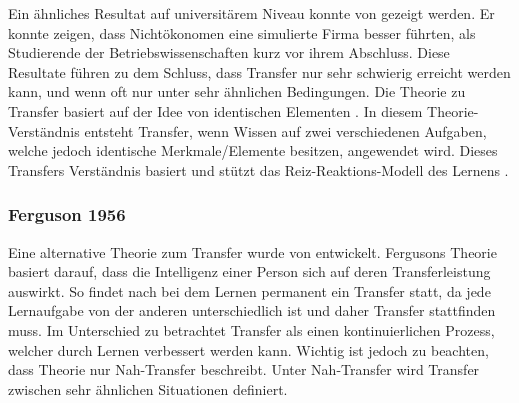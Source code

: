 Ein ähnliches Resultat auf universitärem Niveau konnte von \citet{Renkl1994} gezeigt werden. Er konnte zeigen, dass Nichtökonomen eine simulierte Firma besser führten, als Studierende der Betriebswissenschaften kurz vor ihrem Abschluss. Diese Resultate führen zu dem Schluss, dass Transfer nur sehr schwierig erreicht werden kann, und wenn oft nur unter sehr ähnlichen Bedingungen. Die \citeauthor{Woodworth1901} Theorie zu Transfer basiert auf der Idee von identischen Elementen \citep{Pea2013b}. In diesem Theorie-Verständnis entsteht Transfer, wenn Wissen auf zwei verschiedenen Aufgaben, welche jedoch identische Merkmale/Elemente besitzen, angewendet wird. Dieses Transfers Verständnis basiert und stützt das Reiz-Reaktions-Modell des Lernens \citep{Detterman1993, Mietzel2007}.


\subsubsection{Ferguson 1956}
Eine alternative Theorie zum Transfer wurde von \citet{Ferguson1956} entwickelt. Fergusons Theorie basiert darauf, dass die Intelligenz einer Person sich auf deren Transferleistung auswirkt. So findet nach \citet{Ferguson1956} bei dem Lernen permanent ein Transfer statt, da jede Lernaufgabe von der anderen unterschiedlich ist und daher Transfer stattfinden muss. Im Unterschied zu \citet{Woodworth1901} betrachtet \citeauthor{Ferguson1956} Transfer als einen kontinuierlichen Prozess, welcher durch Lernen verbessert werden kann. Wichtig ist jedoch zu beachten, dass \citeauthor{Ferguson1956} Theorie nur Nah-Transfer beschreibt. Unter Nah-Transfer wird Transfer zwischen sehr ähnlichen Situationen definiert. 


